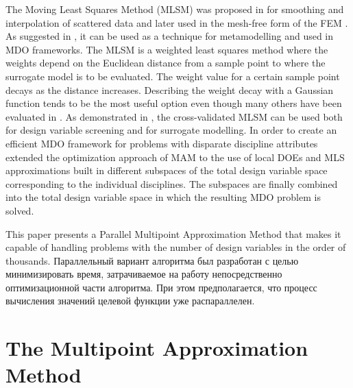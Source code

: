 \documentclass[runningheads,a4paper]{llncs}
\begin{document}
The Moving Least Squares Method (MLSM) was proposed in \cite{LancasterSalkauskas1981} for smoothing and interpolation of scattered data and later used in the mesh-free form of the FEM \cite{Liszka1984}. As suggested in \cite{ChoiYounYang2001}, it can be used as a technique for metamodelling and used in MDO frameworks. The MLSM is a weighted least squares method where the weights depend on the Euclidean distance from a sample point to where the surrogate model is to be evaluated. The weight value for a certain sample point decays as the distance increases. Describing the weight decay with a Gaussian function tends to be the most useful option even though many others have been evaluated in \cite{ToropovSchrammSahaiJones2005}. As demonstrated in \cite{PolynkinToropov2010}, the cross-validated MLSM can be used both for design variable screening and for surrogate modelling. In order to create an efficient MDO framework for problems with disparate discipline attributes \cite{OllarToropovJones2014} extended the optimization approach of MAM to the use of local DOEs and MLS approximations built in different subspaces of the total design variable space corresponding to the individual disciplines. The subspaces are finally combined into the total design variable space in which the resulting MDO problem is solved.

\Russian
This paper presents a Parallel Multipoint Approximation Method that makes it capable of handling problems with the number of design variables in the order of thousands. Параллельный вариант алгоритма был разработан с целью минимизировать время, затрачиваемое на работу непосредственно оптимизационной части алгоритма. При этом предполагается, что процесс вычисления значений целевой функции уже распараллелен.

\section{The Multipoint Approximation Method}
\label{sec:MAM}
\end{document}
